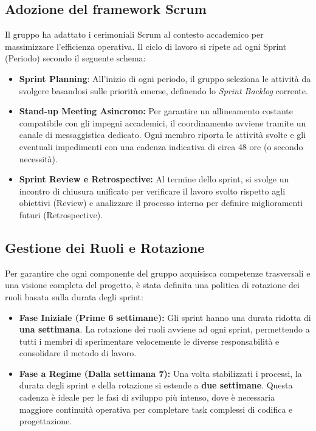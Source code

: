 \documentclass[a4paper, 11pt, oneside]{scrartcl} %
\begin{document}
\subsection{Adozione del framework Scrum}
Il gruppo ha adattato i cerimoniali Scrum al contesto accademico per massimizzare l'efficienza operativa. Il ciclo di lavoro si ripete ad ogni Sprint (Periodo) secondo il seguente schema:
\begin{itemize}
    \item \textbf{Sprint Planning}{\scriptsize{}}: All'inizio di ogni periodo, il gruppo seleziona le attività da svolgere basandosi sulle priorità emerse, definendo lo \textit{Sprint Backlog}{\scriptsize{}} corrente.
    \item \textbf{Stand-up Meeting Asincrono:} Per garantire un allineamento costante compatibile con gli impegni accademici, il coordinamento avviene tramite un canale di messaggistica dedicato. Ogni membro riporta le attività svolte e gli eventuali impedimenti con una cadenza indicativa di circa 48 ore (o secondo necessità).
    \item \textbf{Sprint Review{\scriptsize{}} e Retrospective{\scriptsize{}}:} Al termine dello sprint, si svolge un incontro di chiusura unificato per verificare il lavoro svolto rispetto agli obiettivi (Review) e analizzare il processo interno per definire miglioramenti futuri (Retrospective).
\end{itemize}

\subsection{Gestione dei Ruoli e Rotazione}
Per garantire che ogni componente del gruppo acquisisca competenze trasversali e una visione completa del progetto, è stata definita una politica di rotazione dei ruoli basata sulla durata degli sprint:
\begin{itemize}
    \item \textbf{Fase Iniziale (Prime 6 settimane):} Gli sprint hanno una durata ridotta di \textbf{una settimana}. La rotazione dei ruoli avviene ad ogni sprint, permettendo a tutti i membri di sperimentare velocemente le diverse responsabilità e consolidare il metodo di lavoro.
    \item \textbf{Fase a Regime (Dalla settimana 7):} Una volta stabilizzati i processi, la durata degli sprint e della rotazione si estende a \textbf{due settimane}. Questa cadenza è ideale per le fasi di sviluppo più intenso, dove è necessaria maggiore continuità operativa per completare task complessi di codifica e progettazione.
\end{itemize}
\end{document}
